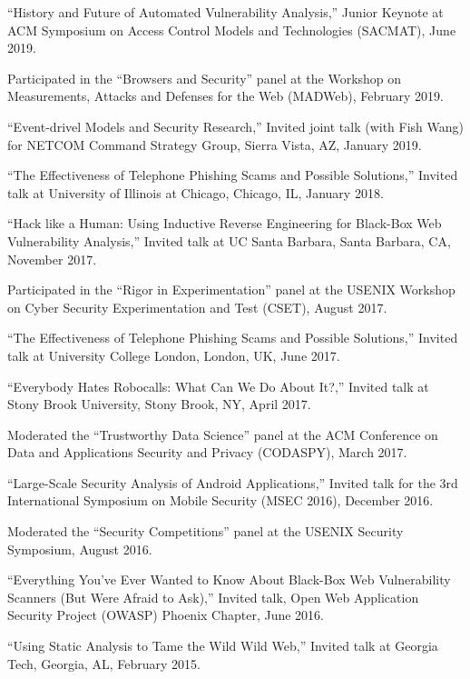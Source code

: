 \documentclass[11pt,letterpaper,sans]{moderncv}
\begin{document}
\begin{etaremune}

  \item ``History and Future of Automated Vulnerability Analysis,'' Junior Keynote at ACM Symposium on Access Control Models and Technologies (SACMAT), June 2019.

  \item Participated in the ``Browsers and Security'' panel at the Workshop on Measurements, Attacks and Defenses for the Web (MADWeb), February 2019.

  \item ``Event-drivel Models and Security Research,'' Invited joint talk (with Fish Wang) for NETCOM Command Strategy Group, Sierra Vista, AZ, January 2019.

  \item ``The Effectiveness of Telephone Phishing Scams and Possible Solutions,''
    Invited talk at University of Illinois at Chicago, Chicago, IL, January 2018.
    
  \item ``Hack like a Human: Using Inductive Reverse Engineering for Black-Box Web Vulnerability Analysis,'' Invited talk at UC Santa Barbara, Santa Barbara, CA, November 2017.

  \item Participated in the ``Rigor in Experimentation'' panel at the
    USENIX Workshop on Cyber Security Experimentation and Test (CSET),
    August 2017.

  \item ``The Effectiveness of Telephone Phishing Scams and Possible Solutions,''
    Invited talk at University College London, London, UK, June
    2017.

  \item ``Everybody Hates Robocalls: What Can We Do About It?,''
    Invited talk at Stony Brook University, Stony Brook, NY, April
    2017.

  \item Moderated the ``Trustworthy Data Science'' panel at the ACM
    Conference on Data and Applications Security and Privacy
    (CODASPY), March 2017.

  \item ``Large-Scale Security Analysis of Android Applications,''
    Invited talk for the 3rd International Symposium on Mobile
    Security (MSEC 2016), December 2016.

  \item Moderated the ``Security Competitions'' panel at the USENIX
    Security Symposium, August 2016.

  \item ``Everything You've Ever Wanted to Know About Black-Box Web
    Vulnerability Scanners (But Were Afraid to Ask),'' Invited talk,
    Open Web Application Security Project (OWASP) Phoenix Chapter,
    June 2016.

  \item ``Using Static Analysis to Tame the Wild Wild Web,'' Invited
    talk at Georgia Tech, Georgia, AL, February 2015.

\end{etaremune}
\end{document}

